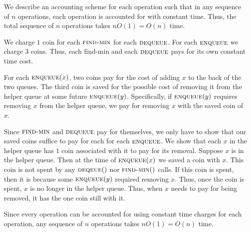 \documentclass[12 pt, letterpaper]{hmcpset}
\begin{document}
\begin{solution}
	We describe an accounting scheme for each operation such that in any sequence of $n$ operations, each operation is accounted for with constant time. Thus, the total sequence of $n$ operations takes $n O(1) = O(n)$ time.

	We charge $1$ coin for each $\textsc{find-min}$ for each $\textsc{dequeue}$. 
	For each $\textsc{enqueue}$ we charge $3$ coins. Thus, each $\text{find-min}$ and each $\textsc{dequeue}$ pays for its own constant time cost.

	For each $\textsc{enqueue}(x)$,
	two coins pay for the cost of adding $x$ to the back of the two queues.
	The third coin is saved for the possible cost of removing it from the helper queue
	at some future $\textsc{enqueue}(y)$.
	Specifically, if $\textsc{enqueue}(y)$ requires removing $x$ from the helper queue,
	we pay for removing $x$ with the saved coin of $x$.

	Since $\textsc{find-min}$ and $\textsc{dequeue}$ pay for themselves,
	we only have to show that our saved coins suffice to pay for each for each $\textsc{enqueue}$.
	We show that each $x$ in the helper queue has $1$ coin associated with it to pay for its removal.
	Suppose $x$ is in the helper queue.
	Then at the time of $\textsc{enqueue}(x)$ we saved a coin with $x$.
	This coin is not spent by any $\textsc{deqeue}()$ nor $\textsc{find-min}()$ calls.
	If this coin is spent, then it is because some $\textsc{enqueue}(y)$ required removing $x$.
	Thus, once the coin is spent, $x$ is no longer in the helper queue.
	Thus, when $x$ needs to pay for being removed, it has the one coin still with it.

	Since every operation can be accounted for using constant time charges for each operation, any sequence of $n$ operations takes $n O(1) = O(n)$ time.
\end{solution}

\pagebreak
\end{document}
